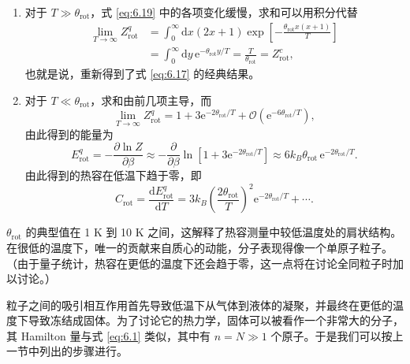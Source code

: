 \begin{enumerate}[label=(\alph*),leftmargin=2.2em,itemsep=0.2em]
\item 对于 $T\gg\theta_{\text{rot}}$，式 \eqref{eq:6.19} 中的各项变化缓慢，求和可以用积分代替
\begin{equation}\label{eq:6.20}
\begin{aligned}
\lim_{T\to\infty}Z^q_{\text{rot}}&=\int_0^{\infty}\mathrm dx(2x+1)\exp\left[-\frac{\theta_{\text{rot}}x(x+1)}{T}\right]\\
&=\int_0^{\infty}\mathrm dy\,\mathrm e^{-\theta_{\text{rot}}y/T}=\frac{T}{\theta_{\text{rot}}}=Z^c_{\text{rot}},
\end{aligned}
\end{equation}
也就是说，重新得到了式 \eqref{eq:6.17} 的经典结果。


\item 对于 $T\ll\theta_{\text{rot}}$，求和由前几项主导，而
\begin{equation}\label{eq:6.21}
\lim_{T\to\infty}Z^q_{\text{rot}}=1+3\mathrm e^{-2\theta_{\text{rot}}/T}+\mathcal O(\mathrm e^{-6\theta_{\text{rot}}/T}),
\end{equation}
由此得到的能量为
\begin{equation}\label{eq:6.22}
E^q_{\text{rot}}=-\frac{\partial\ln Z}{\partial\beta}\approx-\frac{\partial}{\partial\beta}\ln\left[1+3\mathrm e^{-2\theta_{\text{rot}}/T}\right]\approx6k_B\theta_{\text{rot}}\,\mathrm e^{-2\theta_{\text{rot}}/T}.
\end{equation}
由此得到的热容在低温下趋于零，即
\begin{equation}\label{eq:6.23}
C_{\text{rot}}=\frac{\mathrm dE^q_{\text{rot}}}{\mathrm dT}=3k_B\left(\frac{2\theta_{\text{rot}}}{T}\right)^2\mathrm e^{-2\theta_{\text{rot}}/T}+\cdots.
\end{equation}
\end{enumerate}


$\theta_{\text{rot}}$ 的典型值在 1 K 到 10 K 之间，这解释了热容测量中较低温度处的肩状结构。在很低的温度下，唯一的贡献来自质心的动能，分子表现得像一个单原子粒子。（由于量子统计，热容在更低的温度下还会趋于零，这一点将在讨论全同粒子时加以讨论。）


粒子之间的吸引相互作用首先导致低温下从气体到液体的凝聚，并最终在更低的温度下导致冻结成固体。为了讨论它的热力学，固体可以被看作一个非常大的分子，其 Hamilton 量与式 \eqref{eq:6.1} 类似，其中有 $n=N\gg1$ 个原子。于是我们可以按上一节中列出的步骤进行。

